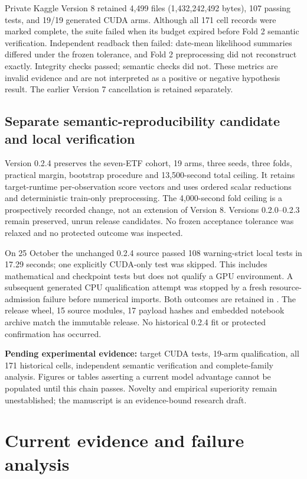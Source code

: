 \documentclass[11pt,a4paper]{article}
\begin{document}
Private Kaggle Version 8 retained 4,499 files (1,432,242,492 bytes),
107 passing tests, and 19/19 generated CUDA arms. Although all 171 cell records
were marked complete, the suite failed when its budget expired before Fold 2
semantic verification. Independent readback then failed: date-mean likelihood
summaries differed under the frozen tolerance, and Fold 2 preprocessing did not
reconstruct exactly. Integrity checks passed; semantic checks did not. These
metrics are invalid evidence and are not interpreted as a positive or negative
hypothesis result. The earlier Version 7 cancellation is retained separately.

\subsection{Separate semantic-reproducibility candidate and local verification}

Version 0.2.4 preserves the seven-ETF cohort, 19 arms, three seeds, three folds,
practical margin, bootstrap procedure and 13,500-second total ceiling. It
retains target-runtime per-observation score vectors and uses ordered scalar
reductions and deterministic train-only preprocessing. The 4,000-second fold
ceiling is a prospectively recorded change, not an extension of Version 8.
Versions 0.2.0--0.2.3 remain preserved, unrun release candidates. No frozen
acceptance tolerance was relaxed and no protected outcome was inspected.

On 25 October the unchanged 0.2.4 source passed 108 warning-strict local tests
in 17.29 seconds; one explicitly CUDA-only test was skipped. This includes
mathematical and checkpoint tests but does not qualify a GPU environment.
A subsequent generated CPU qualification attempt was stopped by a fresh
resource-admission failure before numerical imports. Both outcomes are retained
in . The release wheel, 15 source modules,
17 payload hashes and embedded notebook archive match the immutable release.
No historical 0.2.4 fit or protected confirmation has occurred.

\textbf{Pending experimental evidence:} target CUDA tests, 19-arm qualification,
all 171 historical cells, independent semantic verification and complete-family
analysis. Figures or tables asserting a current model advantage cannot be
populated until this chain passes. Novelty and empirical superiority remain
unestablished; the manuscript is an evidence-bound research draft.

\section{Current evidence and failure analysis}
\label{sec:evidence}
\end{document}
